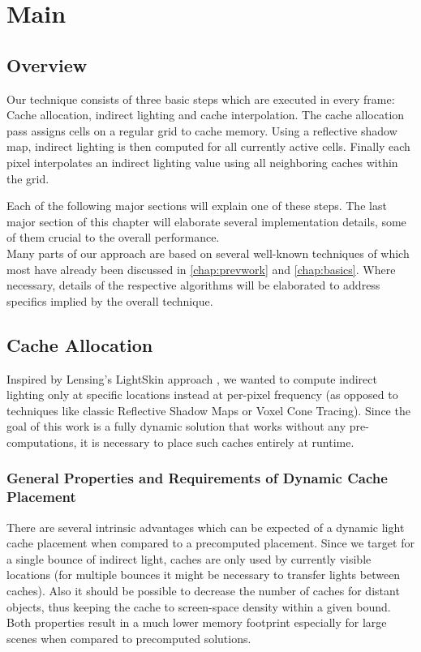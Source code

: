 \documentclass[thesis.tex]{subfiles}
\begin{document}
\chapter{Main}\label{chap:basics}

\section{Overview}
Our technique consists of three basic steps which are executed in every frame: Cache allocation, indirect lighting and cache interpolation.
The cache allocation pass assigns cells on a regular grid to cache memory.
Using a reflective shadow map, indirect lighting is then computed for all currently active cells.
Finally each pixel interpolates an indirect lighting value using all neighboring caches within the grid.

Each of the following major sections will explain one of these steps.
The last major section of this chapter will elaborate several implementation details, some of them crucial to the overall performance.\\
Many parts of our approach are based on several well-known techniques of which most have already been discussed in \autoref{chap:prevwork} and \autoref{chap:basics}.
Where necessary, details of the respective algorithms will be elaborated to address specifics implied by the overall technique.

\section{Cache Allocation}
Inspired by Lensing's LightSkin approach \cite{bib:LightskinPaper}, we wanted to compute indirect lighting only at specific locations instead at per-pixel frequency (as opposed to techniques like classic Reflective Shadow Maps or Voxel Cone Tracing).
Since the goal of this work is a fully dynamic solution that works without any pre-computations, it is necessary to place such caches entirely at runtime.

\subsection{General Properties and Requirements of Dynamic Cache Placement}
There are several intrinsic advantages which can be expected of a dynamic light cache placement when compared to a precomputed placement.
Since we target for a single bounce of indirect light, caches are only used by currently visible locations (for multiple bounces it might be necessary to transfer lights between caches).
Also it should be possible to decrease the number of caches for distant objects, thus keeping the cache to screen-space density within a given bound.
Both properties result in a much lower memory footprint especially for large scenes when compared to precomputed solutions.
\end{document}
